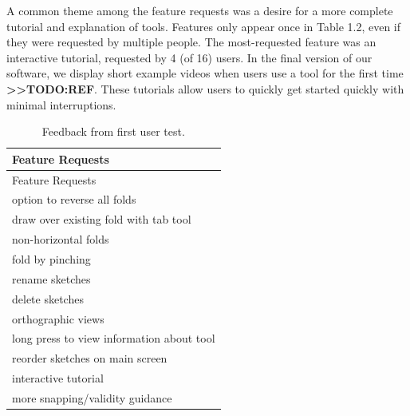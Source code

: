 A common theme among the feature requests was a desire for a more
complete tutorial and explanation of tools. Features only appear once in
Table 1.2, even if they were requested by multiple people. The
most-requested feature was an interactive tutorial, requested by 4 (of
16) users. In the final version of our software, we display short
example videos when users use a tool for the first time
\textbf{\textgreater{}\textgreater{}TODO:REF}. These tutorials allow
users to quickly get started quickly with minimal interruptions.

\begin{longtable}[c]{@{}l@{}}
\caption{Feedback from first user test.}\tabularnewline
\toprule
\begin{minipage}[b]{0.82\columnwidth}\raggedright\strut
Feature Requests
\strut\end{minipage}\tabularnewline
\midrule
\endfirsthead
\toprule
\begin{minipage}[b]{0.82\columnwidth}\raggedright\strut
Feature Requests
\strut\end{minipage}\tabularnewline
\midrule
\endhead
\begin{minipage}[t]{0.82\columnwidth}\raggedright\strut
option to reverse all folds
\strut\end{minipage}\tabularnewline
\begin{minipage}[t]{0.82\columnwidth}\raggedright\strut
draw over existing fold with tab tool
\strut\end{minipage}\tabularnewline
\begin{minipage}[t]{0.82\columnwidth}\raggedright\strut
non-horizontal folds
\strut\end{minipage}\tabularnewline
\begin{minipage}[t]{0.82\columnwidth}\raggedright\strut
fold by pinching
\strut\end{minipage}\tabularnewline
\begin{minipage}[t]{0.82\columnwidth}\raggedright\strut
rename sketches
\strut\end{minipage}\tabularnewline
\begin{minipage}[t]{0.82\columnwidth}\raggedright\strut
delete sketches
\strut\end{minipage}\tabularnewline
\begin{minipage}[t]{0.82\columnwidth}\raggedright\strut
orthographic views
\strut\end{minipage}\tabularnewline
\begin{minipage}[t]{0.82\columnwidth}\raggedright\strut
long press to view information about tool
\strut\end{minipage}\tabularnewline
\begin{minipage}[t]{0.82\columnwidth}\raggedright\strut
reorder sketches on main screen
\strut\end{minipage}\tabularnewline
\begin{minipage}[t]{0.82\columnwidth}\raggedright\strut
interactive tutorial
\strut\end{minipage}\tabularnewline
\begin{minipage}[t]{0.82\columnwidth}\raggedright\strut
more snapping/validity guidance
\strut\end{minipage}\tabularnewline
\bottomrule
\end{longtable}

